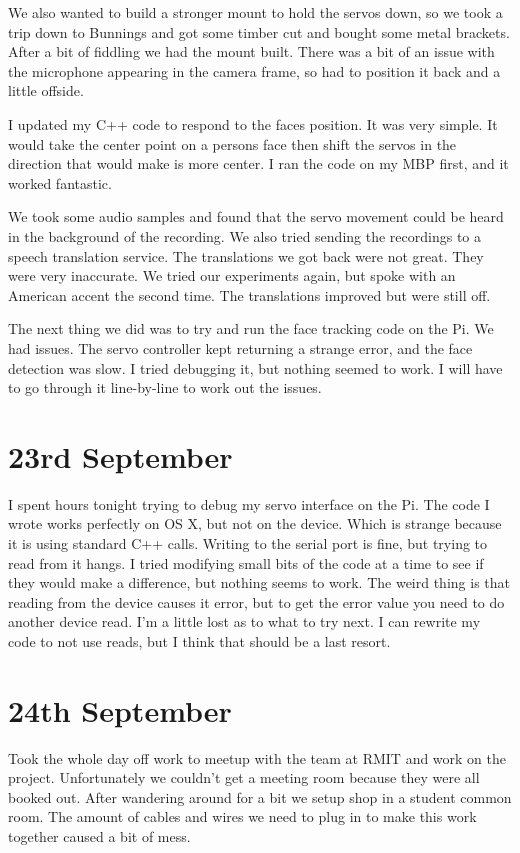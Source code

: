 We also wanted to build a stronger mount to hold the servos down, so we took a trip down to Bunnings and got some timber cut and bought some metal brackets. After a bit of fiddling we had the mount built. There was a bit of an issue with the microphone appearing in the camera frame, so had to position it back and a little offside.

I updated my C++ code to respond to the faces position. It was very simple. It would take the center point on a persons face then shift the servos in the direction that would make is more center. I ran the code on my MBP first, and it worked fantastic.

We took some audio samples and found that the servo movement could be heard in the background of the recording. We also tried sending the recordings to a speech translation service. The translations we got back were not great. They were very inaccurate. We tried our experiments again, but spoke with an American accent the second time. The translations improved but were still off.

The next thing we did was to try and run the face tracking code on the Pi. We had issues. The servo controller kept returning a strange error, and the face detection was slow. I tried debugging it, but nothing seemed to work. I will have to go through it line-by-line to work out the issues.

\section*{23rd September}

I spent hours tonight trying to debug my servo interface on the Pi. The code I wrote works perfectly on OS X, but not on the device. Which is strange because it is using standard C++ calls. Writing to the serial port is fine, but trying to read from it hangs. I tried modifying small bits of the code at a time to see if they would make a difference, but nothing seems to work. The weird thing is that reading from the device causes it error, but to get the error value you need to do another device read. I'm a little lost as to what to try next. I can rewrite my code to not use reads, but I think that should be a last resort.


\section*{24th September}

Took the whole day off work to meetup with the team at RMIT and work on the project. Unfortunately we couldn't get a meeting room because they were all booked out. After wandering around for a bit we setup shop in a student common room. The amount of cables and wires we need to plug in to make this work together caused a bit of mess.


